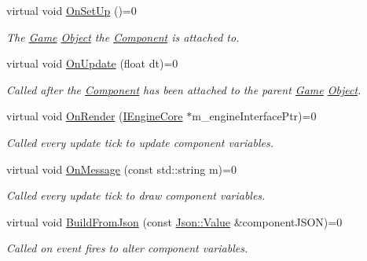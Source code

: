 \begin{DoxyCompactItemize}
\item 
\hypertarget{class_component_a27f86131a87b858143069631fade78fb}{virtual void \hyperlink{class_component_a27f86131a87b858143069631fade78fb}{On\+Set\+Up} ()=0}\label{class_component_a27f86131a87b858143069631fade78fb}

\begin{DoxyCompactList}\small\item\em The \hyperlink{class_game}{Game} \hyperlink{class_object}{Object} the \hyperlink{class_component}{Component} is attached to. \end{DoxyCompactList}\item 
\hypertarget{class_component_ab71d7f4b6d8792287a9b0c9e045acbe0}{virtual void \hyperlink{class_component_ab71d7f4b6d8792287a9b0c9e045acbe0}{On\+Update} (float dt)=0}\label{class_component_ab71d7f4b6d8792287a9b0c9e045acbe0}

\begin{DoxyCompactList}\small\item\em Called after the \hyperlink{class_component}{Component} has been attached to the parent \hyperlink{class_game}{Game} \hyperlink{class_object}{Object}. \end{DoxyCompactList}\item 
\hypertarget{class_component_aa9f90c2587b0c1182d804f4e256d97df}{virtual void \hyperlink{class_component_aa9f90c2587b0c1182d804f4e256d97df}{On\+Render} (\hyperlink{class_i_engine_core}{I\+Engine\+Core} $\ast$m\+\_\+engine\+Interface\+Ptr)=0}\label{class_component_aa9f90c2587b0c1182d804f4e256d97df}

\begin{DoxyCompactList}\small\item\em Called every update tick to update component variables. \end{DoxyCompactList}\item 
\hypertarget{class_component_a1a880fe5e212cd7ef8241e220660417d}{virtual void \hyperlink{class_component_a1a880fe5e212cd7ef8241e220660417d}{On\+Message} (const std\+::string m)=0}\label{class_component_a1a880fe5e212cd7ef8241e220660417d}

\begin{DoxyCompactList}\small\item\em Called every update tick to draw component variables. \end{DoxyCompactList}\item 
\hypertarget{class_component_acd902c5b6b2f3e991966a3ec9c5196b0}{virtual void \hyperlink{class_component_acd902c5b6b2f3e991966a3ec9c5196b0}{Build\+From\+Json} (const \hyperlink{class_json_1_1_value}{Json\+::\+Value} \&component\+J\+S\+O\+N)=0}\label{class_component_acd902c5b6b2f3e991966a3ec9c5196b0}

\begin{DoxyCompactList}\small\item\em Called on event fires to alter component variables. \end{DoxyCompactList}\end{DoxyCompactItemize}

